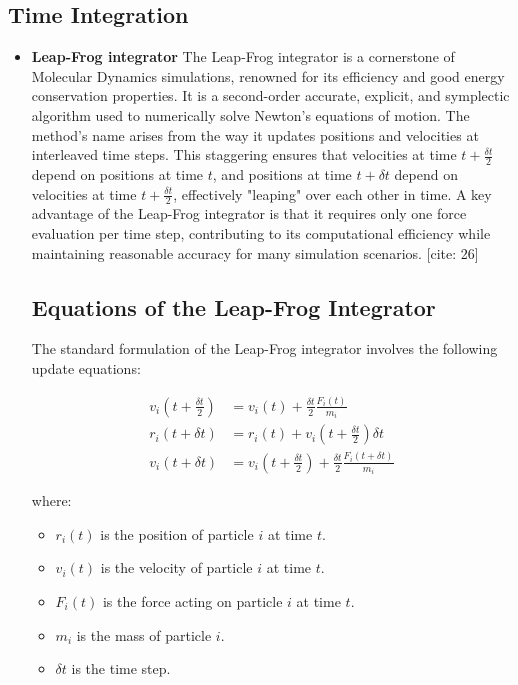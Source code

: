 \documentclass[a4paper,10pt]{article}
\begin{document}
\subsection*{Time Integration}
\begin{itemize}
\item \textbf{Leap-Frog integrator}
The Leap-Frog integrator is a cornerstone of Molecular Dynamics simulations, renowned for its efficiency and good energy conservation properties. It is a second-order accurate, explicit, and symplectic algorithm used to numerically solve Newton's equations of motion. The method's name arises from the way it updates positions and velocities at interleaved time steps. This staggering ensures that velocities at time $t + \frac{\delta t}{2}$ depend on positions at time $t$, and positions at time $t + \delta t$ depend on velocities at time $t + \frac{\delta t}{2}$, effectively "leaping" over each other in time. A key advantage of the Leap-Frog integrator is that it requires only one force evaluation per time step, contributing to its computational efficiency while maintaining reasonable accuracy for many simulation scenarios. [cite: 26]

\subsection*{Equations of the Leap-Frog Integrator}

The standard formulation of the Leap-Frog integrator involves the following update equations:

\begin{align}
v_{i}\left(t + \frac{\delta t}{2}\right) &= v_{i}(t) + \frac{\delta t}{2} \frac{F_{i}(t)}{m_{i}} \\
r_{i}(t + \delta t) &= r_{i}(t) + v_{i}\left(t + \frac{\delta t}{2}\right) \delta t \\
v_{i}(t + \delta t) &= v_{i}\left(t + \frac{\delta t}{2}\right) + \frac{\delta t}{2} \frac{F_{i}(t + \delta t)}{m_{i}}
\end{align}

where:
\begin{itemize}
    \item $r_{i}(t)$ is the position of particle $i$ at time $t$.
    \item $v_{i}(t)$ is the velocity of particle $i$ at time $t$.
    \item $F_{i}(t)$ is the force acting on particle $i$ at time $t$.
    \item $m_{i}$ is the mass of particle $i$.
    \item $\delta t$ is the time step.
\end{itemize}


\end{itemize}
\end{document}
